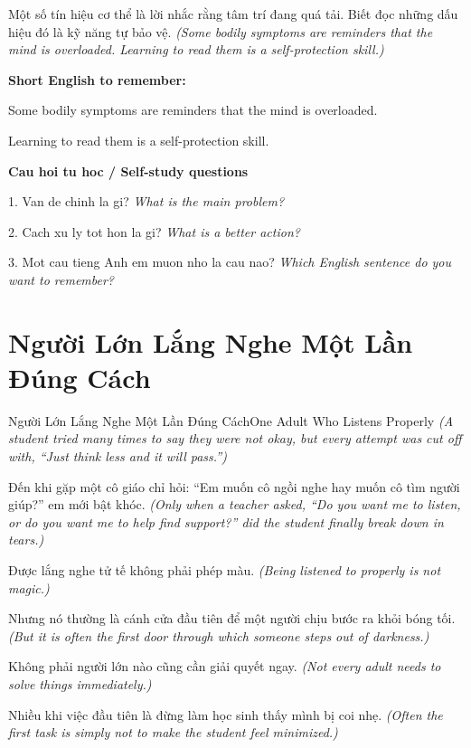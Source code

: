 \begin{baihoc}
Một số tín hiệu cơ thể là lời nhắc rằng tâm trí đang quá tải. Biết đọc những dấu hiệu đó là kỹ năng tự bảo vệ.
\textit{(Some bodily symptoms are reminders that the mind is overloaded. Learning to read them is a self-protection skill.)}
\end{baihoc}

\begin{ghinhoanh}
\textbf{Short English to remember:}

Some bodily symptoms are reminders that the mind is overloaded.

Learning to read them is a self-protection skill.

\end{ghinhoanh}

\begin{tuhocnhanh}
\textbf{Cau hoi tu hoc / Self-study questions}

1. Van de chinh la gi? \textit{What is the main problem?}

2. Cach xu ly tot hon la gi? \textit{What is a better action?}

3. Mot cau tieng Anh em muon nho la cau nao? \textit{Which English sentence do you want to remember?}
\end{tuhocnhanh}
\ngancach

\section{Người Lớn Lắng Nghe Một Lần Đúng Cách}
\begin{truyen}{Người Lớn Lắng Nghe Một Lần Đúng Cách}{One Adult Who Listens Properly}
\textit{(A student tried many times to say they were not okay, but every attempt was cut off with, ``Just think less and it will pass.'')}

Đến khi gặp một cô giáo chỉ hỏi: ``Em muốn cô ngồi nghe hay muốn cô tìm người giúp?'' em mới bật khóc.
\textit{(Only when a teacher asked, ``Do you want me to listen, or do you want me to help find support?'' did the student finally break down in tears.)}

Được lắng nghe tử tế không phải phép màu.
\textit{(Being listened to properly is not magic.)}

Nhưng nó thường là cánh cửa đầu tiên để một người chịu bước ra khỏi bóng tối.
\textit{(But it is often the first door through which someone steps out of darkness.)}

Không phải người lớn nào cũng cần giải quyết ngay.
\textit{(Not every adult needs to solve things immediately.)}

Nhiều khi việc đầu tiên là đừng làm học sinh thấy mình bị coi nhẹ.
\textit{(Often the first task is simply not to make the student feel minimized.)}

\end{truyen}

